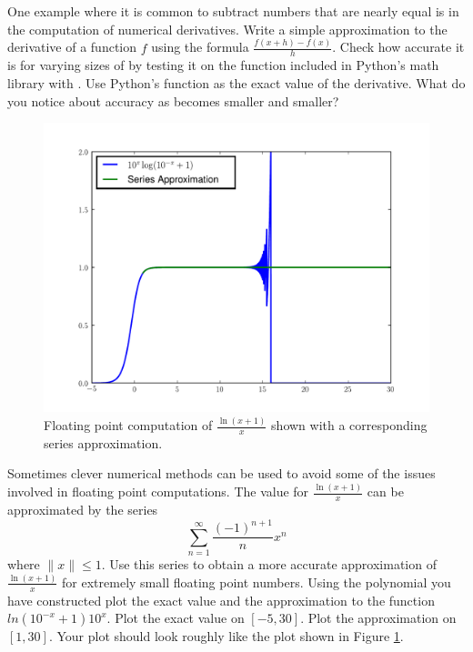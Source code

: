 \begin{problem}
One example where it is common to subtract numbers that are nearly equal is in the computation of numerical derivatives.
Write a simple approximation to the derivative of a function $f$ using the formula $\frac{f(x+h) - f(x)}{h}$.
Check how accurate it is for varying sizes of  by testing it on the  function included in Python's math library with .
Use Python's  function as the exact value of the derivative.
What do you notice about accuracy as  becomes smaller and smaller?
\end{problem}

\begin{figure}
\includegraphics[width=\textwidth]{lnseries.pdf}
\caption{Floating point computation of $\frac{\ln \left(x+1\right)}{x}$ shown with a corresponding series approximation.}
\label{floatbreak:lnseries}
\end{figure}

\begin{problem}
Sometimes clever numerical methods can be used to avoid some of the issues involved in floating point computations.
The value for $\frac{\ln \left(x+1\right)}{x}$ can be approximated by the series
\[
\sum_{n=1}^{\infty} \frac{\left( -1 \right)^{n+1}}{n} x^n
\]
where $\| x \| \leq 1$.
Use this series to obtain a more accurate approximation of $\frac{\ln \left(x+1\right)}{x}$ for extremely small floating point numbers.
Using the polynomial you have constructed plot the exact value and the approximation to the function $ln \left( 10^{-x} + 1 \right)10^{x}$.
Plot the exact value on $[-5, 30]$.
Plot the approximation on $[1, 30]$.
Your plot should look roughly like the plot shown in Figure \ref{floatbreak:lnseries}.
\end{problem}


